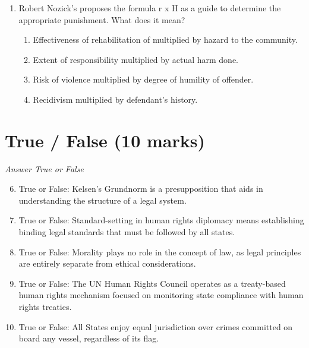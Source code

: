 \documentclass[12pt]{article}
\begin{document}
\begin{enumerate}[label=\arabic*.]
\begin{enumerate}[label=(\alph*)]
    \item Law is like language.
    \item Law is the deliberate expression of a sovereign's will.
    \item Law is an integral element of the social fabric.
\end{enumerate}
\item Robert Nozick's proposes the formula r x H as a guide to determine the appropriate punishment. What does it mean?
\begin{enumerate}[label=(\alph*)]
    \item Effectiveness of rehabilitation of multiplied by hazard to the community.
    \item Extent of responsibility multiplied by actual harm done.
    \item Risk of violence multiplied by degree of humility of offender.
    \item Recidivism multiplied by defendant's history.
\end{enumerate}
\end{enumerate}

\section*{True / False (10 marks)}
\textit{Answer True or False}
\begin{enumerate}[label=\arabic*.]
\setcounter{enumi}{5}
\item True or False: Kelsen's Grundnorm is a presupposition that aids in understanding the structure of a legal system.
\item True or False: Standard-setting in human rights diplomacy means establishing binding legal standards that must be followed by all states.
\item True or False: Morality plays no role in the concept of law, as legal principles are entirely separate from ethical considerations.
\item True or False: The UN Human Rights Council operates as a treaty-based human rights mechanism focused on monitoring state compliance with human rights treaties.
\item True or False: All States enjoy equal jurisdiction over crimes committed on board any vessel, regardless of its flag.
\end{enumerate}
\end{document}
